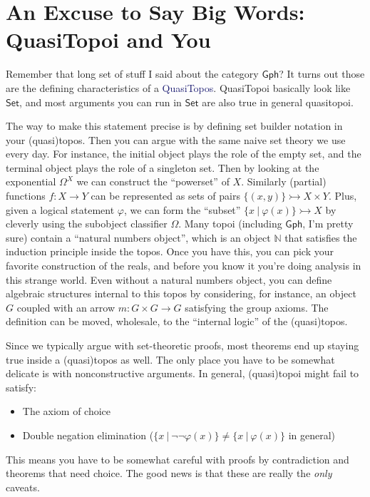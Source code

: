 \documentclass[12pt]{article}
\theoremstyle{definition}
\newcommand{\N}{\mathbb{N}}
\newcommand{\monor}{\rightarrowtail}
\newcommand*{\important}[1]{\textcolor{MidnightBlue}{#1}}
\begin{document}
\section{An Excuse to Say Big Words: QuasiTopoi and You}

Remember that long set of stuff I said about the category $\mathsf{Gph}$?
It turns out those are the defining characteristics of a \important{QuasiTopos}.
QuasiTopoi basically look like $\mathsf{Set}$, and most arguments you can
run in $\mathsf{Set}$ are also true in general quasitopoi. 

The way to make this statement precise is by defining set builder notation in your (quasi)topos. 
Then you can argue with the same naive set theory we use every day.
For instance, the initial object plays the role of the empty set,
and the terminal object plays the role of a singleton set. Then by 
looking at the exponential $\Omega^X$ we can construct the ``powerset'' of $X$.
Similarly (partial) functions $f : X \to Y$ can be represented as sets of
pairs $\{(x,y)\} \monor X \times Y$. Plus, given a logical statement
$\varphi$, we can form the ``subset'' $\{ x ~|~ \varphi(x) \} \monor X$ by
cleverly using the subobject classifier $\Omega$. Many topoi 
(including $\mathsf{Gph}$, I'm pretty sure) contain a ``natural numbers object'',
which is an object $\N$ that satisfies the induction principle inside the topos.
Once you have this, you can pick your favorite construction of the
reals, and before you know it you're doing analysis in this strange world.
Even without a natural numbers object, you can define algebraic structures
internal to this topos by considering, for instance, an object $G$ 
coupled with an arrow $m : G \times G \to G$ satisfying the group axioms.
The definition can be moved, wholesale, to the ``internal logic'' of the (quasi)topos.

Since we typically argue with set-theoretic proofs, most theorems end up 
staying true inside a (quasi)topos as well. The only place you have to be 
somewhat delicate is with nonconstructive arguments. In general, 
(quasi)topoi might fail to satisfy:

\begin{itemize}
  \item The axiom of choice
  \item Double negation elimination ($\{ x ~|~ \lnot \lnot \varphi(x) \} \neq \{ x ~|~ \varphi(x)\}$ in general)
\end{itemize}

This means you have to be somewhat careful with proofs by contradiction and
theorems that need choice. The good news is that these are really the 
\emph{only} caveats.
\end{document}
